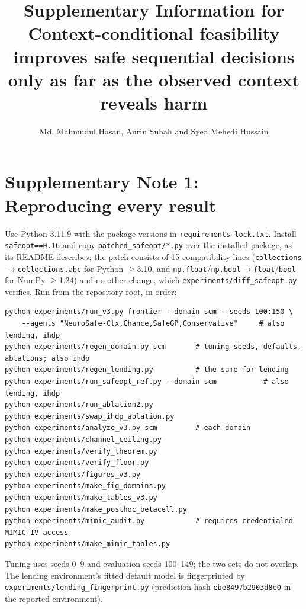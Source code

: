 \documentclass[11pt,a4paper]{article}
\title{\large\bfseries Supplementary Information for\\[3pt]
Context-conditional feasibility improves safe sequential decisions only as far as the observed context reveals harm}
\author{Md. Mahmudul Hasan, Aurin Subah and Syed Mehedi Hussain}
\date{}
\begin{document}
\maketitle

\section*{Supplementary Note 1: Reproducing every result}
{\sloppy Use Python 3.11.9 with the package versions in \texttt{requirements-lock.txt}. Install
\texttt{safeopt==0.16} and copy \texttt{patched\_safeopt/*.py} over the installed package, as its README
describes; the patch consists of 15 compatibility lines (\texttt{collections}$\to$\texttt{collections.abc}
for Python $\ge$3.10, and \texttt{np.float}/\texttt{np.bool}$\to$\texttt{float}/\texttt{bool} for NumPy
$\ge$1.24) and no other change, which \texttt{experiments/diff\_safeopt.py} verifies. Run from the
repository root, in order:\par}
{\footnotesize
\begin{verbatim}
python experiments/run_v3.py frontier --domain scm --seeds 100:150 \
    --agents "NeuroSafe-Ctx,Chance,SafeGP,Conservative"     # also lending, ihdp
python experiments/regen_domain.py scm       # tuning seeds, defaults, ablations; also ihdp
python experiments/regen_lending.py          # the same for lending
python experiments/run_safeopt_ref.py --domain scm           # also lending, ihdp
python experiments/run_ablation2.py
python experiments/swap_ihdp_ablation.py
python experiments/analyze_v3.py scm         # each domain
python experiments/channel_ceiling.py
python experiments/verify_theorem.py
python experiments/verify_floor.py
python experiments/figures_v3.py
python experiments/make_fig_domains.py
python experiments/make_tables_v3.py
python experiments/make_posthoc_betacell.py
python experiments/mimic_audit.py            # requires credentialed MIMIC-IV access
python experiments/make_mimic_tables.py
\end{verbatim}}
Tuning uses seeds 0--9 and evaluation seeds 100--149; the two sets do not overlap. The lending
environment's fitted default model is fingerprinted by \texttt{experiments/lending\_fingerprint.py}
(prediction hash \texttt{ebe8497b2903d8e0} in the reported environment).
\end{document}
